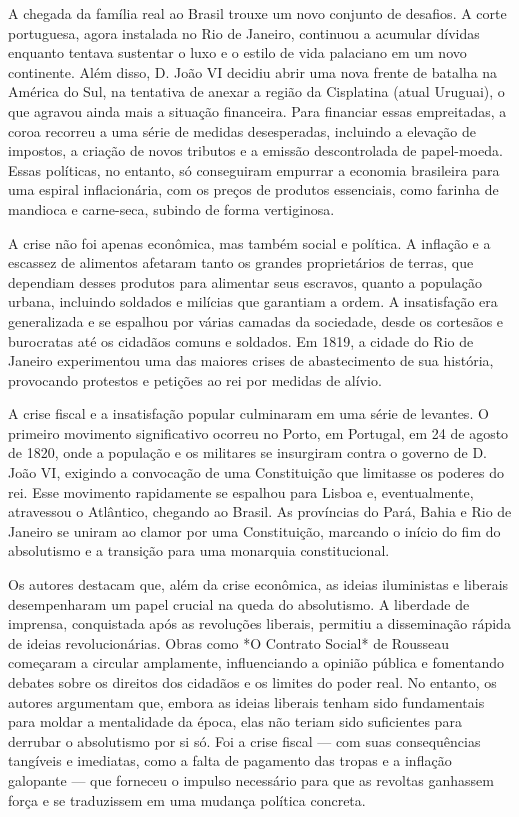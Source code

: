 \documentclass[a4paper,12pt]{article}[abntex2]
\begin{document}
A chegada da família real ao Brasil trouxe um novo conjunto de desafios. A corte portuguesa, agora instalada no Rio de Janeiro, continuou a acumular dívidas enquanto tentava sustentar o luxo e o estilo de vida palaciano em um novo continente. Além disso, D. João VI decidiu abrir uma nova frente de batalha na América do Sul, na tentativa de anexar a região da Cisplatina (atual Uruguai), o que agravou ainda mais a situação financeira. Para financiar essas empreitadas, a coroa recorreu a uma série de medidas desesperadas, incluindo a elevação de impostos, a criação de novos tributos e a emissão descontrolada de papel-moeda. Essas políticas, no entanto, só conseguiram empurrar a economia brasileira para uma espiral inflacionária, com os preços de produtos essenciais, como farinha de mandioca e carne-seca, subindo de forma vertiginosa.

A crise não foi apenas econômica, mas também social e política. A inflação e a escassez de alimentos afetaram tanto os grandes proprietários de terras, que dependiam desses produtos para alimentar seus escravos, quanto a população urbana, incluindo soldados e milícias que garantiam a ordem. A insatisfação era generalizada e se espalhou por várias camadas da sociedade, desde os cortesãos e burocratas até os cidadãos comuns e soldados. Em 1819, a cidade do Rio de Janeiro experimentou uma das maiores crises de abastecimento de sua história, provocando protestos e petições ao rei por medidas de alívio.

A crise fiscal e a insatisfação popular culminaram em uma série de levantes. O primeiro movimento significativo ocorreu no Porto, em Portugal, em 24 de agosto de 1820, onde a população e os militares se insurgiram contra o governo de D. João VI, exigindo a convocação de uma Constituição que limitasse os poderes do rei. Esse movimento rapidamente se espalhou para Lisboa e, eventualmente, atravessou o Atlântico, chegando ao Brasil. As províncias do Pará, Bahia e Rio de Janeiro se uniram ao clamor por uma Constituição, marcando o início do fim do absolutismo e a transição para uma monarquia constitucional.

Os autores destacam que, além da crise econômica, as ideias iluministas e liberais desempenharam um papel crucial na queda do absolutismo. A liberdade de imprensa, conquistada após as revoluções liberais, permitiu a disseminação rápida de ideias revolucionárias. Obras como *O Contrato Social* de Rousseau começaram a circular amplamente, influenciando a opinião pública e fomentando debates sobre os direitos dos cidadãos e os limites do poder real. No entanto, os autores argumentam que, embora as ideias liberais tenham sido fundamentais para moldar a mentalidade da época, elas não teriam sido suficientes para derrubar o absolutismo por si só. Foi a crise fiscal — com suas consequências tangíveis e imediatas, como a falta de pagamento das tropas e a inflação galopante — que forneceu o impulso necessário para que as revoltas ganhassem força e se traduzissem em uma mudança política concreta.
\end{document}
